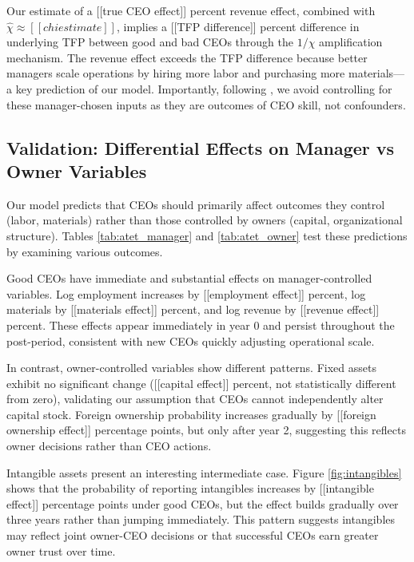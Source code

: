 \documentclass[11pt,a4paper]{article}
\begin{document}
Our estimate of a [[true CEO effect]] percent revenue effect, combined with $\hat{\chi} \approx [[chi estimate]]$, implies a [[TFP difference]] percent difference in underlying TFP between good and bad CEOs through the $1/\chi$ amplification mechanism. The revenue effect exceeds the TFP difference because better managers scale operations by hiring more labor and purchasing more materials—a key prediction of our model. Importantly, following \citet{Gandhi2020-nu}, we avoid controlling for these manager-chosen inputs as they are outcomes of CEO skill, not confounders.



\subsection{Validation: Differential Effects on Manager vs Owner Variables}

Our model predicts that CEOs should primarily affect outcomes they control (labor, materials) rather than those controlled by owners (capital, organizational structure). Tables \ref{tab:atet_manager} and \ref{tab:atet_owner} test these predictions by examining various outcomes.

Good CEOs have immediate and substantial effects on manager-controlled variables. Log employment increases by [[employment effect]] percent, log materials by [[materials effect]] percent, and log revenue by [[revenue effect]] percent. These effects appear immediately in year 0 and persist throughout the post-period, consistent with new CEOs quickly adjusting operational scale.



In contrast, owner-controlled variables show different patterns. Fixed assets exhibit no significant change ([[capital effect]] percent, not statistically different from zero), validating our assumption that CEOs cannot independently alter capital stock. Foreign ownership probability increases gradually by [[foreign ownership effect]] percentage points, but only after year 2, suggesting this reflects owner decisions rather than CEO actions.

Intangible assets present an interesting intermediate case. Figure \ref{fig:intangibles} shows that the probability of reporting intangibles increases by [[intangible effect]] percentage points under good CEOs, but the effect builds gradually over three years rather than jumping immediately. This pattern suggests intangibles may reflect joint owner-CEO decisions or that successful CEOs earn greater owner trust over time.
\end{document}
